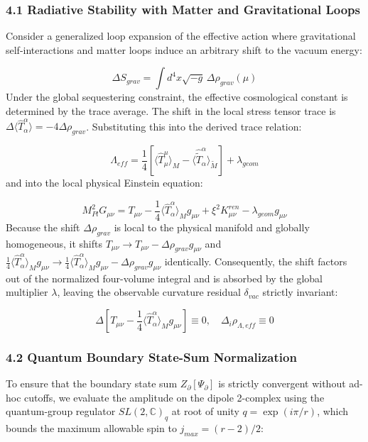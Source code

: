 \documentclass[aps,prd,onecolumn,superscriptaddress,nofootinbib,longbibliography,10pt]{revtex4-2}
\begin{document}
{{  
  
\subsubsection*{4.1 Radiative Stability with Matter and Gravitational Loops}

  Consider a generalized loop expansion of the effective action where gravitational self-interactions and matter loops induce an arbitrary shift to the vacuum energy:


  \[ \Delta S_{grav} = \int d^4x\sqrt{-g}\,\Delta\rho_{grav}(\mu) \]
  Under the global sequestering constraint, the effective cosmological constant is determined by the trace average. The shift in the local stress tensor trace is \(\Delta\langle \hat{T}^\alpha_\alpha \rangle = -4\Delta\rho_{grav}\). Substituting this into the derived trace relation:


  \[ \Lambda_{eff} = \frac{1}{4}\left[ \langle \hat{T}^\mu_\mu \rangle_M - \langle \hat{\tilde{T}}^\alpha_\alpha \rangle_{\tilde{M}} \right] + \lambda_{geom} \]
  and into the local physical Einstein equation:


  \[ M_{Pl}^2 G_{\mu\nu} = T_{\mu\nu} - \frac{1}{4}\langle \hat{T}^\alpha_\alpha \rangle_M g_{\mu\nu} + \xi^2 K_{\mu\nu}^{ren} - \lambda_{geom}g_{\mu\nu} \]
  Because the shift \(\Delta\rho_{grav}\) is local to the physical manifold and globally homogeneous, it shifts \(T_{\mu\nu} \to T_{\mu\nu} - \Delta\rho_{grav}g_{\mu\nu}\) and \(\frac{1}{4}\langle \hat{T}^\alpha_\alpha \rangle_M g_{\mu\nu} \to \frac{1}{4}\langle \hat{T}^\alpha_\alpha \rangle_M g_{\mu\nu} - \Delta\rho_{grav}g_{\mu\nu}\) identically. Consequently, the shift factors out of the normalized four-volume integral and is absorbed by the global multiplier \(\lambda\), leaving the observable curvature residual \(\delta_{vac}\) strictly invariant:


  \[ \Delta\left[ T_{\mu\nu} - \frac{1}{4}\langle \hat{T}^\alpha_\alpha \rangle_M g_{\mu\nu} \right] \equiv 0, \quad \Delta_i\rho_{\Lambda,eff} \equiv 0 \]

  
\subsubsection*{4.2 Quantum Boundary State-Sum Normalization}

  To ensure that the boundary state sum \(Z_\partial[\Psi_\partial]\) is strictly convergent without ad-hoc cutoffs, we evaluate the amplitude on the dipole 2-complex using the quantum-group regulator \(SL(2,\mathbb{C})_q\) at root of unity \(q = \exp(i\pi/r)\), which bounds the maximum allowable spin to \(j_{max} = (r - 2)/2\):


}}
\end{document}
